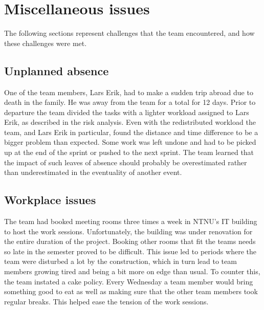 \section{Miscellaneous issues}
The following sections represent challenges that the team encountered, and how these challenges were met.

\subsection{Unplanned absence}
One of the team members, Lars Erik, had to make a sudden trip abroad due to
death in the family. He was away from the team for a total for 12 days. Prior
to departure the team divided the tasks with a lighter workload assigned to Lars
Erik, as described in the risk analysis. Even with the redistributed workload
the team, and Lars Erik in particular, found the distance and time difference to
be a bigger problem than expected. Some work was left undone and had to be
picked up at the end of the sprint or pushed to the next sprint. The team
learned that the impact of such leaves of absence should probably be
overestimated rather than underestimated in the eventuality of another event.

\subsection{Workplace issues}
The team had booked meeting rooms three times a week in NTNU's IT building to host the work sessions. Unfortunately, the building was under renovation for the entire duration of the project. Booking other rooms that fit the teams needs so late in the semester proved to be difficult. This issue led to periods where the team were disturbed a lot by the construction, which in turn lead to team members growing tired and being a bit more on edge than usual. To counter this, the team instated a cake policy. Every Wednesday a team member would bring something good to eat as well as making sure that the other team members took regular breaks. This helped ease the tension of the work sessions.

\begin{comment}
\subsection{Excessive discussion}
The team has seen that much time is being spent discussing a lot. The discussion was of importance, but it drained too much of the time. To solve this, it was decided that there should be set a certain amount of time for the discussions. Should the discussions last longer than the time set, the project leader's task was to focus on ending the discussions, and instead perform a democratic vote based on the arguments that were presented. 
\end{comment}

